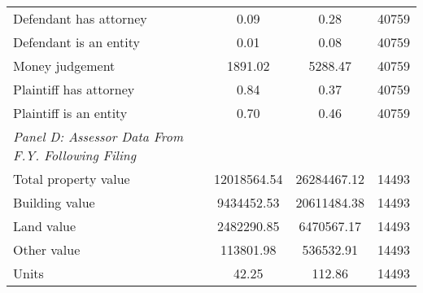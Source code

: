 \begin{table}[htbp]
\begin{tabular}{l*{1}{ccc}}
\hspace{0.25cm}Defendant has attorney&        0.09&        0.28&       40759\\
\hspace{0.25cm}Defendant is an entity&        0.01&        0.08&       40759\\
\hspace{0.25cm}Money judgement&     1891.02&     5288.47&       40759\\
\hspace{0.25cm}Plaintiff has attorney&        0.84&        0.37&       40759\\
\hspace{0.25cm}Plaintiff is an entity&        0.70&        0.46&       40759\\
\emph{Panel D: Assessor Data From F.Y. Following Filing}&            &            &            \\
\hspace{0.25cm}Total property value& 12018564.54& 26284467.12&       14493\\
\hspace{0.25cm}Building value&  9434452.53& 20611484.38&       14493\\
\hspace{0.25cm}Land value&  2482290.85&  6470567.17&       14493\\
\hspace{0.25cm}Other value&   113801.98&   536532.91&       14493\\
\hspace{0.25cm}Units&       42.25&      112.86&       14493\\
\bottomrule
\end{tabular}
\end{table}
